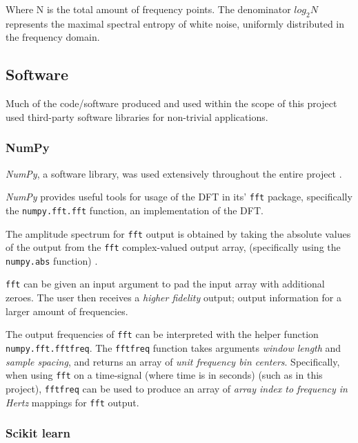 \documentclass{article}
\begin{document}
Where N is the total amount of frequency points.
The denominator \begin{math}log_2 N\end{math} represents the maximal spectral entropy of white noise, uniformly distributed in the frequency domain.

\subsection{Software}

Much of the code/software produced and used within the scope of this project used third-party software libraries for non-trivial applications.

\subsubsection{NumPy}\label{NumPy BG}

\textit{NumPy}, a software library, was used extensively throughout the entire project \citep{numpy}.

\textit{NumPy} provides useful tools for usage of the DFT in its' \texttt{fft} package, specifically the \texttt{numpy.fft.fft} function, an implementation of the DFT. 

The amplitude spectrum for \texttt{fft} output is obtained by taking the absolute values of the output from the \texttt{fft} complex-valued output array, (specifically using the \texttt{numpy.abs} function) \citep{numpy}.

\texttt{fft} can be given an input argument to pad the input array with additional zeroes. 
The user then receives a \textit{higher fidelity} output; output information for a larger amount of frequencies.

The output frequencies of \texttt{fft} can be interpreted with the helper function \texttt{numpy.fft.fftfreq}. 
The \texttt{fftfreq} function takes arguments \textit{window length} and \textit{sample spacing}, and returns an array of \textit{unit frequency bin centers}. 
Specifically, when using \texttt{fft} on a time-signal (where time is in seconds) (such as in this project), \texttt{fftfreq} can be used to produce an array of \textit{array index to frequency in Hertz} mappings for \texttt{fft} output.

\subsubsection{Scikit learn}\label{SK BG}
\end{document}
